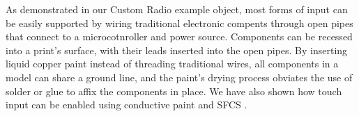 


As demonstrated in our Custom Radio example object, most forms of input can be easily supported by wiring traditional electronic compents through open pipes that connect to a microcotnroller and power source. Components can be recessed into a print's surface, with their leads inserted into the open pipes.  By inserting liquid copper paint instead of threading traditional wires, all components in a model can share a ground line, and the paint's drying process obviates the use of solder or glue to affix the components in place. We have also shown how touch input can be enabled using conductive paint and SFCS \cite{Sato-touche}. 

